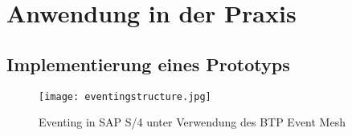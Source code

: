 \section{Anwendung in der Praxis}
\subsection{Implementierung eines Prototyps}
\begin{figure}[H]
    \centering
    \texttt{[image: eventingstructure.jpg]}
    \caption[Eventing in SAP]{Eventing in SAP S/4 unter Verwendung des BTP Event Mesh \footnotemark}
    \label{BEstructure}
  \end{figure}


 
